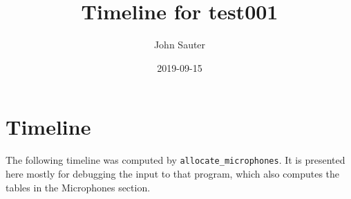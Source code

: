 \documentclass[letterpaper]{article}
\title{Timeline for test001}
\author{John Sauter}
\date{2019-09-15}
\begin{document}
\maketitle
\newpage

\section {Timeline}
The following timeline was computed by {\tt allocate\_microphones}.
It is presented here mostly for debugging the input to that program,
which also computes the tables in the Microphones section.


\end{document}
